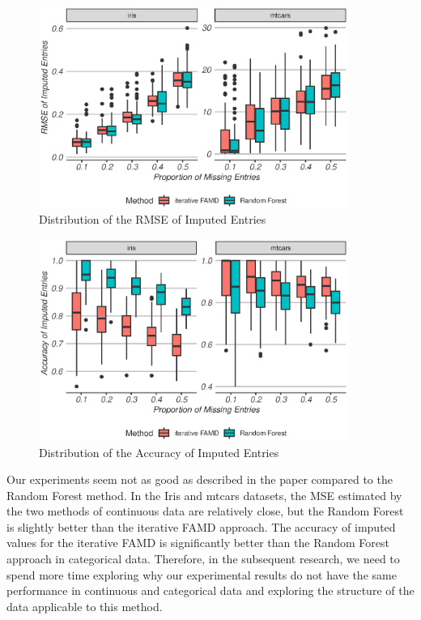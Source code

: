 \documentclass[a4paper,12pt,authoryear]{elegantpaper}
\begin{document}
    \begin{figure}[!hbt]
        \centering
        \includegraphics[width=0.9\textwidth]{./figures/rmse_mixed_dataset.eps}
        \caption{Distribution of the RMSE of Imputed Entries}
        \label{figure:rmse_mixed_dataset}
    \end{figure}

    \begin{figure}[!hbt]
        \centering
        \includegraphics[width=0.9\textwidth]{./figures/accuracy_mixed_dataset.eps}
        \caption{Distribution of the Accuracy of Imputed Entries}
        \label{figure:accuracy_mixed_dataset}
    \end{figure}

    Our experiments seem not as good as described in the paper compared to the Random Forest method. In the Iris and mtcars datasets, the MSE estimated by the two methods of continuous data are relatively close, but the Random Forest is slightly better than the iterative FAMD approach. The accuracy of imputed values for the iterative FAMD is significantly better than the Random Forest approach in categorical data. Therefore, in the subsequent research, we need to spend more time exploring why our experimental results do not have the same performance in continuous and categorical data and exploring the structure of the data applicable to this method.
\end{document}
